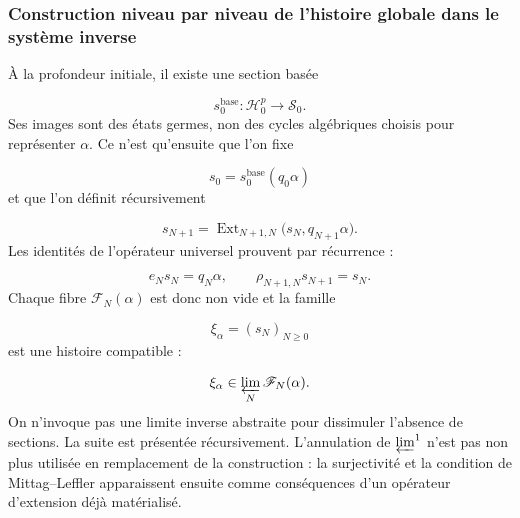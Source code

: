 \subsubsection{Construction niveau par niveau de l’histoire globale dans le système inverse}
À la profondeur initiale, il existe une section basée\par
\[
s_0^{\mathrm{base}}:
\mathscr H_0^p\longrightarrow\mathscr S_0.
\]
Ses images sont des états germes, non des cycles algébriques choisis pour représenter \(\alpha\). Ce n’est qu’ensuite que l’on fixe\par
\[
s_0=s_0^{\mathrm{base}}(q_0\alpha)
\]
et que l’on définit récursivement\par
\[
s_{N+1}
=
\operatorname{Ext}_{N+1,N}
\bigl(s_N,q_{N+1}\alpha\bigr).
\]
Les identités de l’opérateur universel prouvent par récurrence :\par
\[
e_Ns_N=q_N\alpha,
\qquad
\rho_{N+1,N}s_{N+1}=s_N.
\]
Chaque fibre \(\mathscr F_N(\alpha)\) est donc non vide et la famille\par
\[
\xi_\alpha=(s_N)_{N\ge0}
\]
est une histoire compatible :\par
\[
\xi_\alpha
\in
\varprojlim_N\mathscr F_N(\alpha).
\]
On n’invoque pas une limite inverse abstraite pour dissimuler l’absence de sections. La suite est présentée récursivement. L’annulation de \(\varprojlim^1\) n’est pas non plus utilisée en remplacement de la construction : la surjectivité et la condition de Mittag–Leffler apparaissent ensuite comme conséquences d’un opérateur d’extension déjà matérialisé.\par
{}
